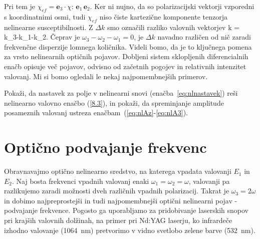 Pri tem je $\chi_{ef}=\mathbf{e}_{3}\cdot\chi:\,\mathbf{e}_{1}\,\mathbf{e}_{2}$.
Ker ni nujno, da so polarizacijski vektorji vzporedni s koordinatnimi osmi, tudi $\chi_{ef}$ 
niso čiste kartezične komponente tenzorja nelinearne susceptibilnosti. 
Z $\Delta k$ smo označili razliko valovnih vektorjev
\beq
\Delta k = k_{3}-k_{1}-k_{2}.
\eeq
Čeprav je $\omega_{3}-\omega_{2}-\omega_{1}=0$, je $\Delta k$ navadno različen od nič zaradi 
frekvenčne disperzije lomnega količnika. Videli bomo, da je to ključnega pomena 
za vrsto nelinearnih optičnih pojavov. Dobljeni sistem sklopljenih diferencialnih enačb opisuje več pojavov, 
odvisno od začetnih pogojev in relativnih intenzitet valovanj. Mi si bomo ogledali le nekaj
najpomembnejših primerov.
\begin{definition}
Pokaži, da nastavek za polje v nelinearni snovi (enačba~\ref{eq:nlnastavek}) reši nelinearno
valovno enačbo (\ref{8.3}), in pokaži, da spreminjanje amplitude posameznih valovanj 
ustreza enačbam~(\ref{eq:nlAz}-\ref{eq:nlA3}).
\end{definition}

\section{Optično podvajanje frekvenc}
Obravnavajmo optično nelinearno sredstvo, na katerega vpadata valovanji $E_1$ in $E_2$.
Naj bosta frekvenci vpadnih valovanj enaki $\omega_{1}=\omega_{2}=\omega$, valovanji
pa razlikujemo zaradi možnosti dveh različnih vpadnih polarizacij. Takrat je $\omega_{3}=2\omega$
in dobimo najpreprostejši in tudi najpomembnejši optični nelinearni pojav - podvajanje 
frekvence. 
Pogosto ga uporabljamo za pridobivanje laserskih snopov pri krajših valovnih dolžinah, na primer
pri Nd:YAG laserju, ko infrardeče izhodno valovanje (1064~nm) 
pretvorimo v vidno svetlobo zelene barve (532~nm). 

